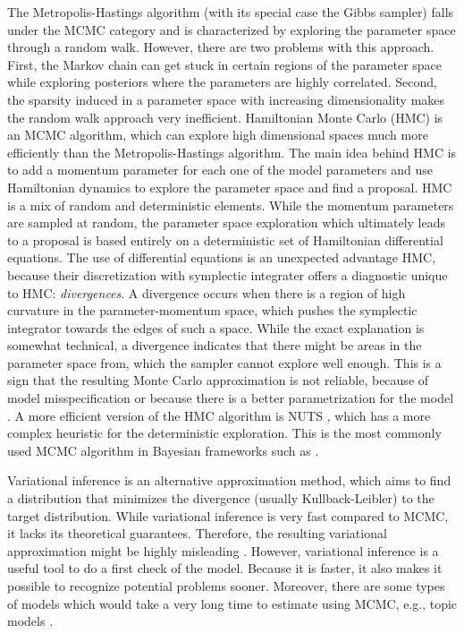 The Metropolis-Hastings algorithm (with its special case the Gibbs sampler) falls under the MCMC category and is characterized by exploring the parameter space through a random walk.
However, there are two problems with this approach.
First, the Markov chain can get stuck in certain regions of the parameter space while exploring posteriors where the parameters are highly correlated.
Second, the sparsity induced in a parameter space with increasing dimensionality makes the random walk approach very inefficient.
Hamiltonian Monte Carlo (HMC) is an MCMC algorithm, which can explore high dimensional spaces much more efficiently than the Metropolis-Hastings algorithm.
The main idea behind HMC is to add a momentum parameter for each one of the model parameters and use Hamiltonian dynamics to explore the parameter space and find a proposal.
HMC is a mix of random and deterministic elements.
While the momentum parameters are sampled at random, the parameter space exploration which ultimately leads to a proposal is based entirely on a deterministic set of Hamiltonian differential equations.
The use of differential equations is an unexpected advantage HMC, because their discretization with symplectic integrater offers a diagnostic unique to HMC: \textit{divergences}.
A divergence occurs when there is a region of high curvature in the parameter-momentum space, which pushes the symplectic integrator towards the edges of such a space.
While the exact explanation is somewhat technical, a divergence indicates that there might be areas in the parameter space from, which the sampler cannot explore well enough.
This is a sign that the resulting Monte Carlo approximation is not reliable, because of model misspecification or because there is a better parametrization for the model \citep{betancourt_conceptual_2017, neal_mcmc_2011}.
A more efficient version of the HMC algorithm is NUTS \citep{hoffman_no-u-turn_2014}, which has a more complex heuristic for the deterministic exploration.
This is the most commonly used MCMC algorithm in Bayesian frameworks such as .

Variational inference is an alternative approximation method, which aims to find a distribution that minimizes the divergence (usually Kullback-Leibler) to the target distribution.
While variational inference is very fast compared to MCMC, it lacks its theoretical guarantees.
Therefore, the resulting variational approximation might be highly misleading \citep{blei_variational_2017}.
However, variational inference is a useful tool to do a first check of the model.
Because it is faster, it also makes it possible to recognize potential problems sooner.
Moreover, there are some types of models which would take a very long time to estimate using MCMC, e.g., topic models \citep{blei_latent_2003}.


